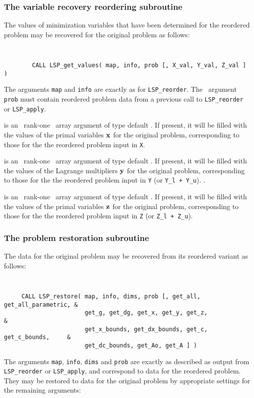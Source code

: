 \documentclass{galahad}
\newcommand{\packagename}{LSP}
\begin{document}

\subsubsection{The  variable recovery reordering subroutine}
The values of minimization variables that have been determined for the
reordered problem may be recovered for the original problem as follows:
\vspace*{-2mm}
{\tt
\begin{verbatim}
        CALL LSP_get_values( map, info, prob [, X_val, Y_val, Z_val ] )
\end{verbatim}
}
\vspace*{-1mm}
\noindent
The arguments {\tt map} and {\tt info} are exactly as for
{\tt \packagename\_reorder}.
The \intentin\ argument {\tt prob}
must contain reordered problem data from a previous call
to {\tt LSP\_reorder} or {\tt LSP\_apply}.

\begin{description}
 is an \optional\ rank-one \intentout\ array argument of
type default \realdp. If
present, it will be filled with the values of the primal variables ${\mathbf{x}}$
for the original problem, corresponding to those for the the reordered
problem input in {\tt X}.

 is an \optional\ rank-one \intentout\ array argument of
type default \realdp. If present,
it will be filled with the values of the Lagrange multipliers ${\mathbf{y}}$
for the original problem, corresponding to those for the the reordered
problem input in {\tt Y} (or {\tt Y\_l + Y\_u}).
.

 is an \optional\ rank-one \intentout\ array argument of
type default \realdp. If
present, it will be filled with the values of the primal variables ${\mathbf{z}}$
for the original problem, corresponding to those for the the reordered
problem input in {\tt Z} (or {\tt Z\_l + Z\_u}).
\end{description}


\subsubsection{The  problem restoration subroutine}
The data for the original problem may be recovered from its reordered
variant as follows:
\vspace*{-2mm}
{\tt
\begin{verbatim}
     CALL LSP_restore( map, info, dims, prob [, get_all, get_all_parametric, &
                       get_g, get_dg, get_x, get_y, get_z,                   &
                       get_x_bounds, get_dx_bounds, get_c, get_c_bounds,     &
                       get_dc_bounds, get_Ao, get_A ] )
\end{verbatim}
}
\vspace*{-1mm}
\noindent
The arguments {\tt map}, {\tt info}, {\tt dims} and {\tt prob} are
exactly as described as output from
{\tt \packagename\_reorder} or {\tt \packagename\_apply},
and correspond to data for the reordered problem.
They may be restored to data for the original problem by appropriate
settings for the remaining arguments:
\end{document}

